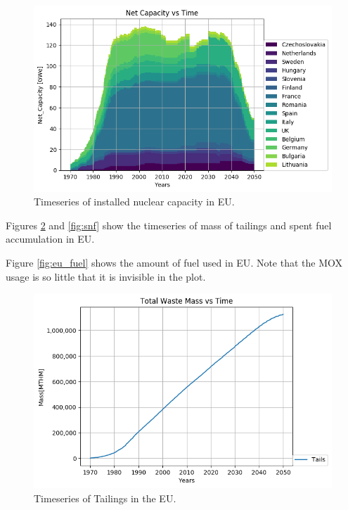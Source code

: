 \begin{figure}[htbp!]
	\begin{center}
		\includegraphics[scale=0.7]{./images/eu_future/power_plot.png}
	\end{center}
	\caption{Timeseries of installed nuclear capacity in \gls{EU}.}
	\label{fig:eu_pow}
\end{figure}

Figures \ref{fig:eu_tail} and \ref{fig:snf} show the 
timeseries of mass of tailings and spent fuel accumulation in \gls{EU}.

Figure \ref{fig:eu_fuel} shows the amount of fuel used in \gls{EU}.
Note that the MOX usage is so little that it is invisible in the
plot. 


\begin{figure}[htbp!]
	\begin{center}
		\includegraphics[scale=0.7]{./images/eu_future/tailings.png}
	\end{center}
	\caption{Timeseries of Tailings in the \gls{EU}.}
	\label{fig:eu_tail}
\end{figure}

